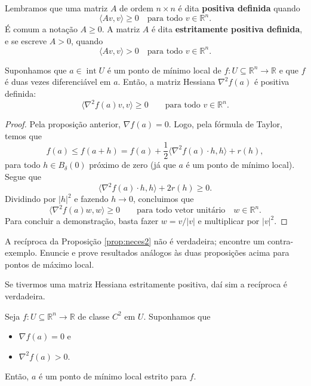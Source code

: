 Lembramos que uma matriz $A$ de ordem $n \times n$ é dita \textbf{positiva definida} quando 
\[
\langle A v, v  \rangle \ge 0 \quad \text{para todo } v \in \mathbb{R}^n.
\] É comum a notação $A \ge 0$. A matriz $A$ é dita \textbf{estritamente positiva definida}, e se escreve $A > 0$, quando
\[
\langle A v, v  \rangle > 0 \quad \text{para todo } v \in \mathbb{R}^n.
\]


\begin{prop}\label{prop:neces2}
	Suponhamos que $a \in \operatorname{int} U$ é um ponto de mínimo local de $f: U \subseteq \mathbb{R}^n \to \mathbb{R}$ e que $f$ é duas vezes diferenciável em $a$. Então, a matriz Hessiana $\nabla^2 f (a)$ é positiva definida:
	\[
	\langle \nabla^2 f (a) v, v  \rangle \ge 0 \qquad \text{para todo } v \in \mathbb{R}^n.
	\]
\end{prop}

\begin{proof}
	Pela proposição anterior, $\nabla f (a) = 0$. Logo, pela fórmula de Taylor, temos que
	\[
	f(a) \le f(a + h) = f(a) + \frac{1}{2} \langle \nabla^2 f (a) \cdot h, h \rangle + r(h),
	\] para todo $h \in B_{\delta} (0)$ próximo de zero (já que $a$ é um ponto de mínimo local). Segue que
	\[
	\langle \nabla^2 f (a) \cdot h, h \rangle + 2 r(h) \ge 0.
	\] Dividindo por $|h|^2$ e fazendo $h \to 0$, concluimos que
	\[
	\langle \nabla^2 f (a) w, w  \rangle \ge 0 \qquad \text{para todo vetor unitário}\quad  w \in \mathbb{R}^n.
	\] Para concluir a demonstração, basta fazer $w = v /|v|$ e multiplicar por $|v|^2$.
\end{proof}


\begin{exer}
	A recíproca da Proposição \ref{prop:neces2} não é verdadeira; encontre um contra-exemplo. Enuncie e prove resultados análogos às duas proposições acima para pontos de máximo local.
\end{exer}

Se tivermos uma matriz Hessiana estritamente positiva, daí sim a recíproca é verdadeira.


\begin{prop}\label{prop:neces3}
	Seja $f: U \subseteq \mathbb{R}^n \to \mathbb{R}$ de classe $C^2$ em $U$. Suponhamos que
	\begin{itemize}
		\item $\nabla f (a) = 0$ e
		
		\item $\nabla^2 f(a) > 0$.
	\end{itemize} Então, $a$ é um ponto de mínimo local estrito para $f$.
\end{prop}

